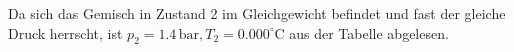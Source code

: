 Da sich das Gemisch in Zustand 2 im Gleichgewicht befindet und fast der gleiche Druck herrscht, ist \( p_2 = 1.4 \, \text{bar}, T_2 = 0.000^\circ \text{C} \) aus der Tabelle abgelesen.